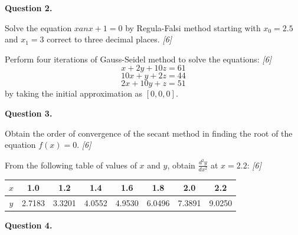 \documentclass[11pt,a4paper]{article}
\newcommand{\pts}[1]{\hfill   \textit{[#1]}}
\begin{document}
\medskip


\noindent   \textbf{Question 2.}

\begin{parts}
  \item Solve the equation $x  an x + 1 = 0$ by Regula-Falsi method starting with $x_0 = 2.5$ and $x_1 = 3$ correct to three decimal places. \pts{6}
  \item Perform four iterations of Gauss-Seidel method to solve the equations: \pts{6}
  \[ x + 2y + 10z = 61 \]
  \[ 10x + y + 2z = 44 \]
  \[ 2x + 10y + z = 51 \]
  by taking the initial approximation as $[0, 0, 0]$.
\end{parts}

\medskip


\noindent   \textbf{Question 3.}

\begin{parts}
  \item Obtain the order of convergence of the secant method in finding the root of the equation $f(x) = 0$. \pts{6}
  \item From the following table of values of $x$ and $y$, obtain $\frac{d^2y}{dx^2}$ at $x = 2.2$: \pts{6}
  
\begin{center}
    
\begin{tabular}{|c|c|c|c|c|c|c|c|}
      \hline
      $x$ & 1.0 & 1.2 & 1.4 & 1.6 & 1.8 & 2.0 & 2.2 \\
      \hline
      $y$ & 2.7183 & 3.3201 & 4.0552 & 4.9530 & 6.0496 & 7.3891 & 9.0250 \\
      \hline
    \end{tabular}
  \end{center}
\end{parts}

\medskip


\noindent   \textbf{Question 4.}
\end{document}

